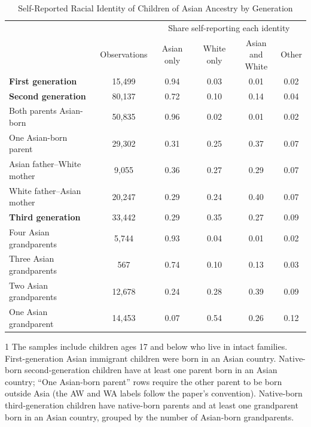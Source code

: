 \begin{table}[H]
\centering
\small{}
\caption{Self-Reported Racial Identity of Children of Asian Ancestry by Generation \label{tab:asianbygen}}
\begin{threeparttable}
\begin{tabular}{lccccc}
\toprule
 & & \multicolumn{4}{c}{Share self-reporting each identity} \\
\cmidrule(l{3pt}r{3pt}){3-6}
 & Observations & Asian only & White only & \specialcell{Asian and \\ White} & Other\\
\midrule
\textbf{First generation} & 15,499 & 0.94 & 0.03 & 0.01 & 0.02\\
\textbf{Second generation} & 80,137 & 0.72 & 0.10 & 0.14 & 0.04\\
\hspace{1em}Both parents Asian-born & 50,835 & 0.96 & 0.02 & 0.01 & 0.02\\
\hspace{1em}One Asian-born parent & 29,302 & 0.31 & 0.25 & 0.37 & 0.07\\
\hspace{1em}\hspace{1em}Asian father--White mother & 9,055 & 0.36 & 0.27 & 0.29 & 0.07\\
\hspace{1em}\hspace{1em}White father--Asian mother & 20,247 & 0.29 & 0.24 & 0.40 & 0.07\\
\textbf{Third generation} & 33,442 & 0.29 & 0.35 & 0.27 & 0.09\\
\hspace{1em}Four Asian grandparents & 5,744 & 0.93 & 0.04 & 0.01 & 0.02\\
\hspace{1em}Three Asian grandparents & 567 & 0.74 & 0.10 & 0.13 & 0.03\\
\hspace{1em}Two Asian grandparents & 12,678 & 0.24 & 0.28 & 0.39 & 0.09\\
\hspace{1em}One Asian grandparent & 14,453 & 0.07 & 0.54 & 0.26 & 0.12\\
\bottomrule
\end{tabular}
\begin{tablenotes}
\small
\item[1] The samples include children ages 17 and below who live in intact families. First-generation Asian immigrant children were born in an Asian country. Native-born second-generation children have at least one parent born in an Asian country; ``One Asian-born parent'' rows require the other parent to be born outside Asia (the AW and WA labels follow the paper's convention). Native-born third-generation children have native-born parents and at least one grandparent born in an Asian country, grouped by the number of Asian-born grandparents.

\end{tablenotes}
\end{threeparttable}
\end{table}
